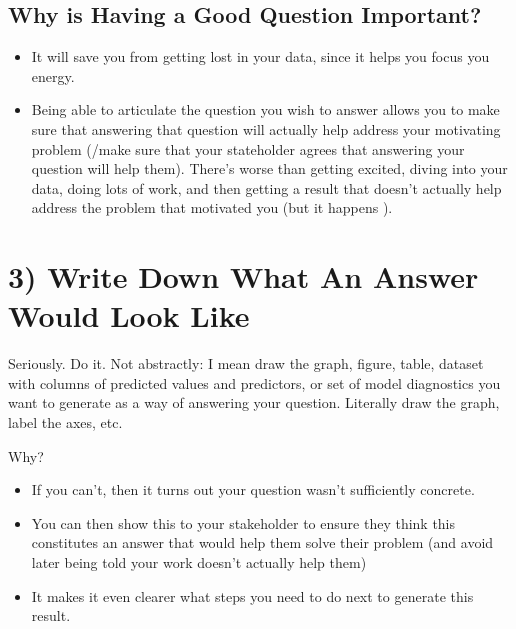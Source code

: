 \documentclass[letterpaper,10pt,english]{jupyterBook}
\begin{document}
\subsection{Why is Having a Good Question Important?}
\label{\detokenize{40_in_practice/05_backwards_design:why-is-having-a-good-question-important}}\begin{itemize}
\item {} 
\sphinxAtStartPar
It will save you from getting lost in your data, since it helps you focus you energy.

\item {} 
\sphinxAtStartPar
Being able to articulate the question you wish to answer allows you to make sure that answering that question will actually help address your motivating problem (/make sure that your stateholder agrees that answering your question will help them). There’s  worse than getting excited, diving into your data, doing lots of work, and then getting a result that doesn’t actually help address the problem that motivated you (but it happens ).

\end{itemize}


\section{3) Write Down What An Answer Would Look Like}
\label{\detokenize{40_in_practice/05_backwards_design:write-down-what-an-answer-would-look-like}}
\sphinxAtStartPar
Seriously. Do it. Not abstractly: I mean draw the graph, figure, table, dataset with columns of predicted values and predictors, or set of model diagnostics you want to generate as a way of answering your question. Literally draw the graph, label the axes, etc.

\sphinxAtStartPar
Why?
\begin{itemize}
\item {} 
\sphinxAtStartPar
If you can’t, then it turns out your question wasn’t sufficiently concrete.

\item {} 
\sphinxAtStartPar
You can then show this to your stakeholder to ensure they think this constitutes an answer that would help them solve their problem (and avoid later being told your work doesn’t actually help them)

\item {} 
\sphinxAtStartPar
It makes it even clearer what steps you need to do next to generate this result.

\end{itemize}
\end{document}
